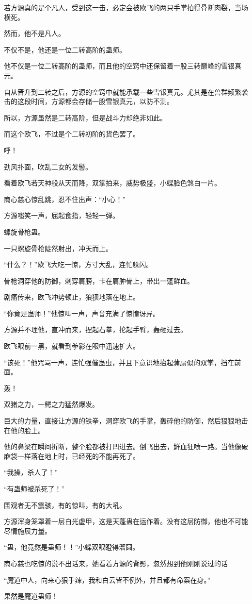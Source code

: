 \begin{this_body}
若方源真的是个凡人，受到这一击，必定会被欧飞的两只手掌拍得骨断肉裂，当场横死。

然而，他不是凡人。

不仅不是，他还是一位二转高阶的蛊师。

他不仅是一位二转高阶的蛊师，而且他的空窍中还保留着一股三转巅峰的雪银真元。

自从晋升到二转之后，方源的空窍中就能承载一些雪银真元。尤其是在兽群频繁袭击的这段时间，方源都会存储一股雪银真元，以防不测。

所以，方源虽然是二转高阶，但是战斗力却绝非如此。

而这个欧飞，不过是个二转初阶的货色罢了。

呼！

劲风扑面，吹乱二女的发髻。

看着欧飞若天神般从天而降，双掌拍来，威势极盛，小蝶脸色煞白一片。

商心慈心惊乱跳，忍不住出声：“小心！”

方源嗤笑一声，屈起食指，轻轻一弹。

螺旋骨枪蛊。

一只螺旋骨枪陡然射出，冲天而上。

“什么？！”欧飞大吃一惊，方寸大乱，连忙躲闪。

骨枪洞穿他的防御，刺穿肩膀，卡在肩肿骨上，带出一蓬鲜血。

剧痛传来，欧飞冲势顿止，狼狈地落在地上。

“你竟是蛊师！”他惊叫一声，声音充满了惊惶讶异。

方源并不理他，直冲而来，捏起右拳，抡起手臂，轰砸过去。

欧飞眼前一黑，就看到拳影在眼中迅速扩大。

“该死！”他咒骂一声，连忙强催蛊虫，并且下意识地抬起蒲扇似的双掌，挡在前面。

轰！

双猪之力，一鳄之力猛然爆发。

巨大的力量，直接让方源的铁拳，洞穿欧飞的手掌，轰碎他的防御，然后狠狠地击在他的脸上。

他的鼻梁在瞬间折断，整个脸都被打凹进去。倒飞出去，鲜血狂喷一路。当他像破麻袋一样落在地上时，已经死的不能再死了。

“我操，杀人了！”

“有蛊师被杀死了！”

围观者无不震骇，有的惊叫，有的大吼。

方源浑身笼罩着一层白光虚甲，这是天蓬蛊在运作着。没有这层防御，他也不可能尽情施展力量。

“蛊，他竟然是蛊师！！”小蝶双眼瞪得溜圆。

商心慈也吃惊的说不出话来，她看着方源的背影，忽然想到他刚刚说过的话

“魔道中人，向来心狠手辣，我和白云皆不例外，并且都有命案在身。”

果然是魔道蛊师！

\end{this_body}

